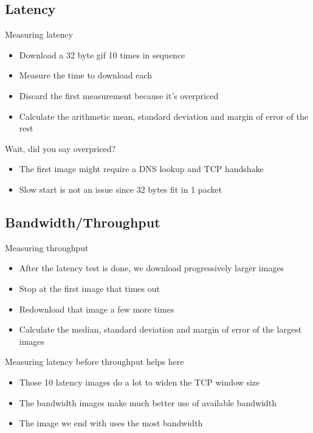 \documentclass{beamer}
\begin{document}
\subsection{Latency}
\begin{frame}{Measuring latency}
  \begin{itemize}
  \item Download a 32 byte gif 10 times in sequence
  \item Measure the time to download each
  \item Discard the first measurement because it's overpriced
  \item Calculate the arithmetic mean, standard deviation and margin of error of the rest
  \end{itemize}
\end{frame}

\begin{frame}{Wait, did you say overpriced?}
  \begin{itemize}
  \item The first image might require a DNS lookup and TCP handshake
  \item Slow start is not an issue since 32 bytes fit in 1 packet
  \end{itemize}
\end{frame}

\subsection{Bandwidth/Throughput}
\begin{frame}{Measuring throughput}
  \begin{itemize}
  \item After the latency test is done, we download progressively larger images
  \item Stop at the first image that times out
  \item Redownload that image a few more times
  \item Calculate the median, standard deviation and margin of error of the largest images
  \end{itemize}
\end{frame}

\begin{frame}{Measuring latency before throughput helps here}
  \begin{itemize}
  \item Those 10 latency images do a lot to widen the TCP window size
  \item The bandwidth images make much better use of available bandwidth
  \item The image we end with uses the most bandwidth
  \end{itemize}
\end{frame}
\end{document}
